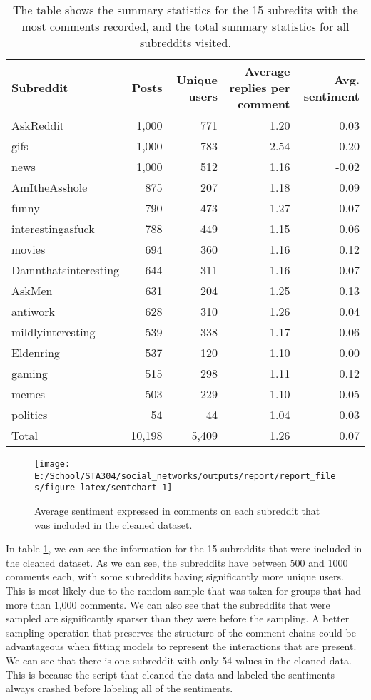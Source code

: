 \documentclass[
]{article}
\begin{document}
\begin{table}

\caption{\label{tab:cleanstats}The table shows the summary statistics for the 15 subredits with the most comments recorded, and the total summary statistics for all subreddits visited.}
\centering
\begin{tabular}[t]{lrrrr}
\toprule
Subreddit & Posts & Unique users & Average replies per comment & Avg. sentiment\\
\midrule
AskReddit & 1,000 & 771 & 1.20 & 0.03\\
gifs & 1,000 & 783 & 2.54 & 0.20\\
news & 1,000 & 512 & 1.16 & -0.02\\
AmItheAsshole & 875 & 207 & 1.18 & 0.09\\
funny & 790 & 473 & 1.27 & 0.07\\
\addlinespace
interestingasfuck & 788 & 449 & 1.15 & 0.06\\
movies & 694 & 360 & 1.16 & 0.12\\
Damnthatsinteresting & 644 & 311 & 1.16 & 0.07\\
AskMen & 631 & 204 & 1.25 & 0.13\\
antiwork & 628 & 310 & 1.26 & 0.04\\
\addlinespace
mildlyinteresting & 539 & 338 & 1.17 & 0.06\\
Eldenring & 537 & 120 & 1.10 & 0.00\\
gaming & 515 & 298 & 1.11 & 0.12\\
memes & 503 & 229 & 1.10 & 0.05\\
politics & 54 & 44 & 1.04 & 0.03\\
\midrule
\addlinespace
Total & 10,198 & 5,409 & 1.26 & 0.07\\
\bottomrule
\end{tabular}
\end{table}

\begin{figure}

{\centering \texttt{[image: E:/School/STA304/social\_networks/outputs/report/report\_files/figure-latex/sentchart-1]} 

}

\caption{Average sentiment expressed in comments on each subreddit that was included in the cleaned dataset.}\label{fig:sentchart}
\end{figure}

In table \ref{tab:cleanstats}, we can see the information for the 15 subreddits that were included in the cleaned dataset. As we can see, the subreddits have between 500 and 1000 comments each, with some subreddits having significantly more unique users. This is most likely due to the random sample that was taken for groups that had more than 1,000 comments. We can also see that the subreddits that were sampled are significantly sparser than they were before the sampling. A better sampling operation that preserves the structure of the comment chains could be advantageous when fitting models to represent the interactions that are present. We can see that there is one subreddit with only 54 values in the cleaned data. This is because the script that cleaned the data and labeled the sentiments always crashed before labeling all of the sentiments.
\end{document}
